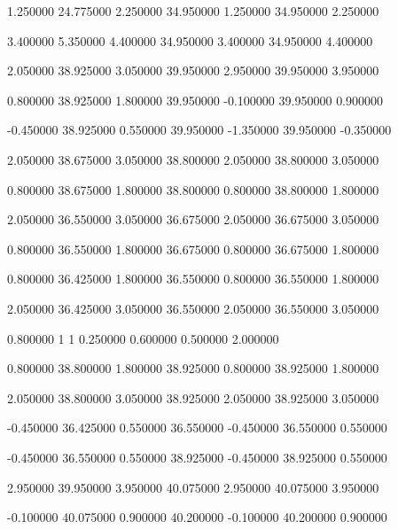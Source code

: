  {1.250000} {24.775000} {2.250000} {34.950000} {1.250000} {34.950000} {2.250000}

 {3.400000} {5.350000} {4.400000} {34.950000} {3.400000} {34.950000} {4.400000}

 {2.050000} {38.925000} {3.050000} {39.950000} {2.950000} {39.950000} {3.950000}

 {0.800000} {38.925000} {1.800000} {39.950000} {-0.100000} {39.950000} {0.900000}

 {-0.450000} {38.925000} {0.550000} {39.950000} {-1.350000} {39.950000} {-0.350000}

 {2.050000} {38.675000} {3.050000} {38.800000} {2.050000} {38.800000} {3.050000}

 {0.800000} {38.675000} {1.800000} {38.800000} {0.800000} {38.800000} {1.800000}

 {2.050000} {36.550000} {3.050000} {36.675000} {2.050000} {36.675000} {3.050000}

 {0.800000} {36.550000} {1.800000} {36.675000} {0.800000} {36.675000} {1.800000}

 {0.800000} {36.425000} {1.800000} {36.550000} {0.800000} {36.550000} {1.800000}

 {2.050000} {36.425000} {3.050000} {36.550000} {2.050000} {36.550000} {3.050000}

 {0.800000} {1} {1} {0.250000} {0.600000} {0.500000} {2.000000}

 {0.800000} {38.800000} {1.800000} {38.925000} {0.800000} {38.925000} {1.800000}

 {2.050000} {38.800000} {3.050000} {38.925000} {2.050000} {38.925000} {3.050000}

 {-0.450000} {36.425000} {0.550000} {36.550000} {-0.450000} {36.550000} {0.550000}

 {-0.450000} {36.550000} {0.550000} {38.925000} {-0.450000} {38.925000} {0.550000}

 {2.950000} {39.950000} {3.950000} {40.075000} {2.950000} {40.075000} {3.950000}

 {-0.100000} {40.075000} {0.900000} {40.200000} {-0.100000} {40.200000} {0.900000}

